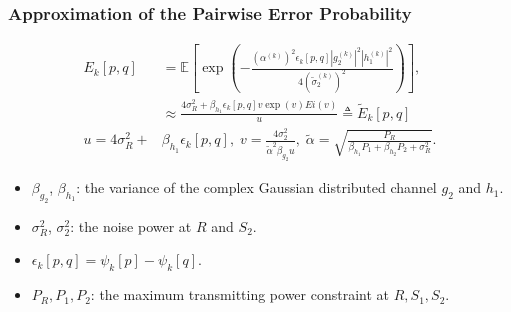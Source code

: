 \documentclass{beamer}
\begin{document}
\begin{frame}
  \frametitle{Approximation of the Pairwise Error Probability}
  \begin{align*}
    E_k[p,q] & = \mathbb{E} \left[\exp\left(
    -\frac{(\alpha^{(k)})^2\epsilon_k[p,q]|g_2^{(k)}|^2 |h_1^{(k)}|^2}
    {4(\tilde{\sigma}_2^{(k)})^2} \right)\right],\\
    & \approx \frac{4\sigma_R^2
    + \beta_{h_1}\epsilon_k[p,q]v\exp(v)Ei(v)}{u} \triangleq \tilde{E}_k[p,q] 
    \\
    u = 4\sigma_R^2 + & \beta_{h_1}\epsilon_k[p,q],\;
    v =
    \frac{4\sigma_2^2}{\tilde{\alpha}^2\beta_{g_2}u},\;
    \tilde{\alpha} = \sqrt{\frac{P_R}{\beta_{h_1}P_1 +
    \beta_{h_2}P_2+\sigma_R^2}}.
  \end{align*}
  \begin{itemize}
    \item $\beta_{g_2}$, $\beta_{h_1}$: the variance of the complex Gaussian
    distributed channel $g_2$ and $h_1$.
    \item $\sigma_R^2$, $\sigma_2^2$: the noise power at $R$ and $S_2$.
    \item $\epsilon_k[p,q] = \psi_k[p] - \psi_k[q].$
    \item $P_R, P_1, P_2$: the maximum transmitting power constraint at
    $R,S_1,S_2$.
  \end{itemize}
\end{frame}
\end{document}
